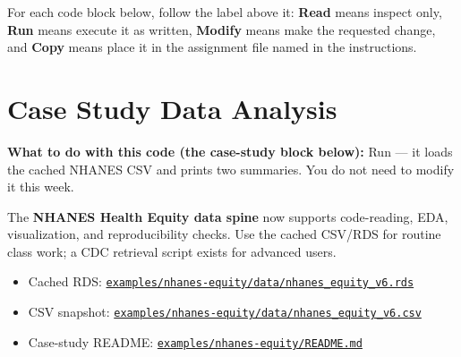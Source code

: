 \documentclass[
  letterpaper,
  DIV=11,
  numbers=noendperiod,
  oneside]{scrreprt}
\providecommand{\tightlist}{%
  \setlength{\itemsep}{0pt}\setlength{\parskip}{0pt}}
\begin{document}
\begin{tcolorbox}[enhanced jigsaw, title=\textcolor{quarto-callout-note-color}{\faInfo}\hspace{0.5em}{How to use the code blocks on this page}, arc=.35mm, toptitle=1mm, colframe=quarto-callout-note-color-frame, toprule=.15mm, leftrule=.75mm, bottomtitle=1mm, opacityback=0, bottomrule=.15mm, coltitle=black, breakable, opacitybacktitle=0.6, titlerule=0mm, colback=white, left=2mm, colbacktitle=quarto-callout-note-color!10!white, rightrule=.15mm]

For each code block below, follow the label above it: \textbf{Read}
means inspect only, \textbf{Run} means execute it as written,
\textbf{Modify} means make the requested change, and \textbf{Copy} means
place it in the assignment file named in the instructions.

\end{tcolorbox}

\section*{Case Study Data Analysis}\label{case-study-data-analysis}


\textbf{What to do with this code (the case-study block below):} Run ---
it loads the cached NHANES CSV and prints two summaries. You do not need
to modify it this week.

The \textbf{NHANES Health Equity data spine} now supports code-reading,
EDA, visualization, and reproducibility checks. Use the cached CSV/RDS
for routine class work; a CDC retrieval script exists for advanced
users.

\begin{itemize}
\tightlist
\item
  Cached RDS:
  \href{https://github.com/ehsanx/HDSx/blob/main/examples/nhanes-equity/data/nhanes_equity_v6.rds}{\texttt{examples/nhanes-equity/data/nhanes\_equity\_v6.rds}}
\item
  CSV snapshot:
  \href{https://github.com/ehsanx/HDSx/blob/main/examples/nhanes-equity/data/nhanes_equity_v6.csv}{\texttt{examples/nhanes-equity/data/nhanes\_equity\_v6.csv}}
\item
  Case-study README:
  \href{https://github.com/ehsanx/HDSx/blob/main/examples/nhanes-equity/README.md}{\texttt{examples/nhanes-equity/README.md}}
\end{itemize}
\end{document}
